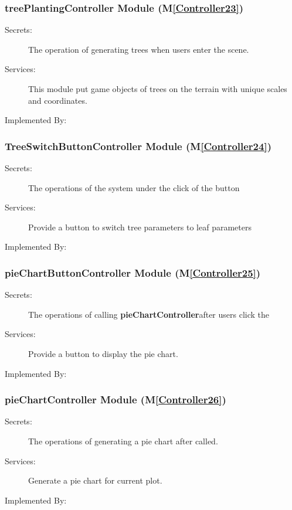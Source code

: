 \documentclass[12pt, titlepage]{article}
\newcommand{\mref}[1]{M\ref{#1}}
\begin{document}
\renewcommand{\bt}{\textbf{plant trees}}
\subsubsection{treePlantingController Module (\mref{Controller23})}
\begin{description}
\item[Secrets:] The operation of generating trees when users enter the scene.
\item[Services:] This module put game objects of trees on the terrain with unique scales and coordinates.
\item[Implemented By:] \progname{}
\end{description}

\renewcommand{\bt}{\textbf{TreeSwitch}}
\subsubsection{TreeSwitchButtonController Module (\mref{Controller24})}
\begin{description}
\item[Secrets:] The operations of the system under the click of the button
\item[Services:] Provide a button to switch tree parameters to leaf parameters
\item[Implemented By:] \progname{}
\end{description}

\renewcommand{\bt}{\textbf{pieChartController}}
\subsubsection{pieChartButtonController Module (\mref{Controller25})}
\begin{description}
\item[Secrets:] The operations of calling \bt  after users click the 
\item[Services:] Provide a button to display the pie chart.
\item[Implemented By:] \progname{}
\end{description}

\renewcommand{\bt}{\textbf{pieChartController}}
\subsubsection{pieChartController Module (\mref{Controller26})}
\begin{description}
\item[Secrets:] The operations of generating a pie chart after called.
\item[Services:] Generate a pie chart for current plot.
\item[Implemented By:] \progname{}
\end{description}
\end{document}
